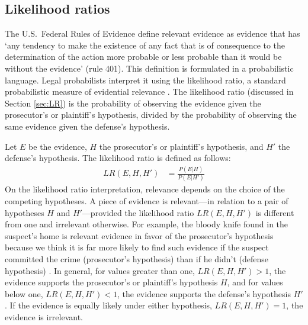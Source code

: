 \documentclass{article}
\begin{document}

\subsection{Likelihood ratios}

The U.S.\ Federal Rules of Evidence
define relevant evidence as evidence that has `any tendency to make the existence of any fact that is of consequence to the determination of the action more probable or less probable than it would be without the evidence' (rule 401). 
This definition is formulated in a probabilistic language.
Legal probabilists interpret it using the likelihood ratio, a standard probabilistic measure of 
evidential relevance \citep{lempert1977modeling,lyon1996relevance,aitken2004statistics, aitken2010fundamentals,sullivan2016LikelihoodStoryTheory}.
The likelihood ratio (discussed in Section \ref{sec:LR}) is the probability of observing the evidence given the prosecutor's or plaintiff's hypothesis,  divided by the probability of observing the same evidence given  the defense's hypothesis. 

Let $E$ be the evidence, $H$ the prosecutor's or plaintiff's hypothesis, and $H'$ the defense's hypothesis. The likelihood ratio 
is defined as follows:
%
\begin{align*}LR(E,H,H') & = \frac{P(E\vert H)}{P(E\vert H')}\end{align*}
%
On the likelihood ratio interpretation, relevance depends on the choice of the competing hypotheses. 
%
A piece of evidence is relevant---in relation to a pair of hypotheses $H$ and $H'$---provided the likelihood ratio  $LR(E, H, H')$ 
is different from one and irrelevant otherwise. For example, 
the bloody knife found in the suspect's home is relevant  evidence in favor of the prosecutor's hypothesis because we think it is far more likely to find such evidence if the suspect committed the crime (prosecutor's hypothesis) than if he didn't (defense hypothesis) %
\citep{finkelstein2009basic}. In general, 
for values greater than one, $LR(E, H, H')>1$, the evidence supports the prosecutor's or plaintiff's hypothesis $H$, and for values below one, $LR(E, H, H')<1$, the evidence supports the defense's hypothesis $H'$.
If the evidence is equally likely under either hypothesis,
$LR(E, H, H')=1$, the evidence is  irrelevant. 
\end{document}
